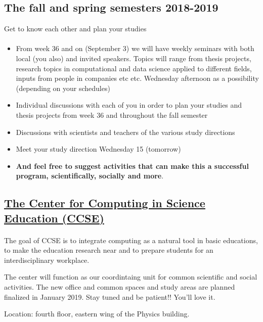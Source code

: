 \documentclass[%
oneside,                 %
final,                   %
10pt]{article}
\begin{document}
\subsection{The fall and spring semesters 2018-2019}
Get to know each other and plan your studies

\paragraph{}
\begin{itemize}
 \item From week 36 and on (September 3) we will have  weekly seminars with both local (you also) and invited speakers. Topics will range from thesis projects, research topics in computational and data science applied to different fields, inputs from people in companies etc etc.  Wednesday afternoon as a possibility (depending on your schedules)

 \item Individual discussions with each of you in order to plan your studies and thesis projects from week 36 and throughout the fall semester

 \item Discussions with scientists and teachers of the various study directions

 \item Meet your study direction Wednesday 15 (tomorrow)

 \item \textbf{And feel free to suggest activities that can make this a successful program, scientifically, socially and more}.
\end{itemize}

\noindent




\subsection{\href{{https://www.mn.uio.no/ccse/english/}}{The Center for Computing in Science Education (CCSE)}}


\paragraph{}
The goal of CCSE is to integrate computing as a natural tool in basic educations, to make the education research near and to prepare students for an interdisciplinary workplace.

The center will function as our coordintaing unit for common scientific and social activities. The new office and common spaces and study areas are planned finalized in January 2019. Stay tuned and be patient!! You'll love it. 

Location: fourth floor, eastern wing of the Physics building.

 




\end{document}
